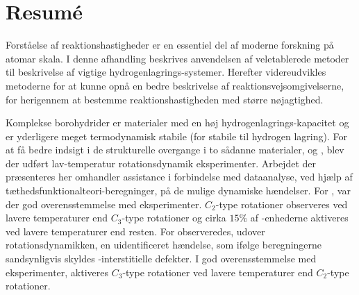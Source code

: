  

\section*{Resum\'e}


Forståelse af reaktionshastigheder er en essentiel del af moderne forskning på atomar skala.
I denne afhandling beskrives anvendelsen af veletablerede metoder til beskrivelse af vigtige hydrogenlagrings-systemer. Herefter videreudvikles metoderne for at kunne opnå en bedre beskrivelse af reaktionsvejsomgivelserne, for herigennem at bestemme reaktionshastigheden med større nøjagtighed.

Komplekse borohydrider er materialer med en høj hydrogenlagrings-kapacitet og er yderligere meget termodynamisk stabile (for stabile til hydrogen lagring).
For at få bedre indsigt i de strukturelle overgange i to sådanne materialer,  og , blev der udført lav-temperatur rotationsdynamik eksperimenter.
Arbejdet der præsenteres her omhandler assistance i forbindelse med dataanalyse, ved hjælp af tæthedsfunktionalteori-beregninger, på de mulige dynamiske hændelser.
For , var der god overensstemmelse med eksperimenter. $C_2$-type rotationer observeres ved lavere temperaturer end $C_3$-type rotationer og cirka $15\%$ af -enhederne aktiveres ved lavere temperaturer end resten.
For  observeredes, udover rotationsdynamikken, en uidentificeret hændelse, som ifølge beregningerne sandsynligvis skyldes -interstitielle defekter.
I god overensstemmelse med eksperimenter, aktiveres $C_3$-type rotationer ved lavere temperaturer end $C_2$-type rotationer.

